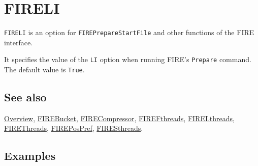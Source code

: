 \documentclass[../FeynHelpersManual.tex]{subfiles}
\begin{document}
\hypertarget{fireli}{
\section{FIRELI}\label{fireli}}

\texttt{FIRELI} is an option for \texttt{FIREPrepareStartFile} and other
functions of the FIRE interface.

It specifies the value of the \texttt{LI} option when running FIRE's
\texttt{Prepare} command. The default value is \texttt{True}.

\subsection{See also}

\hyperlink{toc}{Overview}, \hyperlink{firebucket}{FIREBucket},
\hyperlink{firecompressor}{FIRECompressor},
\hyperlink{firefthreads}{FIREFthreads},
\hyperlink{firelthreads}{FIRELthreads},
\hyperlink{firethreads}{FIREThreads},
\hyperlink{firepospref}{FIREPosPref},
\hyperlink{firesthreads}{FIRESthreads}.

\subsection{Examples}
\end{document}
